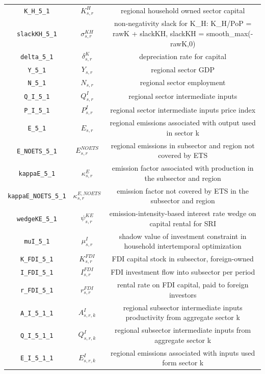 \begin{center}
\begin{longtable}{ccc}
\texttt{K\_H\_5\_1} & ${K^H_{s,r}}$ & regional household owned sector capital\\
\texttt{slackKH\_5\_1} & ${\sigma^{KH}_{s,r}}$ & non-negativity slack for K\_H: K\_H/PoP = rawK + slackKH, slackKH = smooth\_max(-rawK,0)\\
\texttt{delta\_5\_1} & ${\delta^{K}_{s,r}}$ & depreciation rate for capital\\
\texttt{Y\_5\_1} & ${Y_{s,r}}$ & regional sector GDP\\
\texttt{N\_5\_1} & ${N_{s,r}}$ & regional sector employment\\
\texttt{Q\_I\_5\_1} & ${Q^{I}_{s,r}}$ & regional sector intermediate inputs\\
\texttt{P\_I\_5\_1} & ${P^{I}_{s,r}}$ & regional sector intermediate inputs price index\\
\texttt{E\_5\_1} & ${E_{s,r}}$ & regional emissions associated with output used in sector k\\
\texttt{E\_NOETS\_5\_1} & ${E^{NOETS}_{s,r}}$ & regional emissions in subsector and region not covered by ETS\\
\texttt{kappaE\_5\_1} & ${\kappa^{E}_{s,r}}$ & emission factor associated with production in the subsector and region\\
\texttt{kappaE\_NOETS\_5\_1} & ${\kappa^{E,NOETS}_{s,r}}$ & emission factor not covered by ETS in the subsector and region\\
\texttt{wedgeKE\_5\_1} & ${\psi^{KE}_{s,r}}$ & emission-intensity-based interest rate wedge on capital rental for SRI\\
\texttt{muI\_5\_1} & ${\mu^{I}_{s,r}}$ & shadow value of investment constraint in household intertemporal optimization\\
\texttt{K\_FDI\_5\_1} & ${K^{FDI}_{s,r}}$ & FDI capital stock in subsector, foreign-owned\\
\texttt{I\_FDI\_5\_1} & ${I^{FDI}_{s,r}}$ & FDI investment flow into subsector per period\\
\texttt{r\_FDI\_5\_1} & ${r^{FDI}_{s,r}}$ & rental rate on FDI capital, paid to foreign investors\\
\texttt{A\_I\_5\_1\_1} & ${A^{I}_{s,r,k}}$ & regional subsector intermediate inputs productivity from aggregate sector k\\
\texttt{Q\_I\_5\_1\_1} & ${Q^{I}_{s,r,k}}$ & regional subsector intermediate inputs from aggregate sector k\\
\texttt{E\_I\_5\_1\_1} & ${E^I_{s,r,k}}$ & regional emissions associated with inputs used form sector k\\

\end{longtable}
\end{center}
